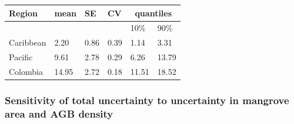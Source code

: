 \documentclass[review, authoryear]{elsarticle}   	%
\begin{document}
\begin{table}[htbp]
   \centering
   \begin{tabular}{p{3.0cm}p{2.0cm}p{2.0cm}p{2.0cm}p{2.0cm}p{2.0cm}} %
      \toprule
       Region & mean & SE & CV & \multicolumn{2}{c}{quantiles}\\
      \midrule
      &&&&10\%&90\%\\
      Caribbean&2.20&0.86&0.39&1.14&3.31\\
      Pacific&9.61&2.78&0.29&6.26&13.79\\
      Colombia&14.95&2.72&0.18&11.51&18.52\\
            \bottomrule
   \end{tabular}
   \label{tab:meansTotal}
\end{table}


\subsubsection{Sensitivity of total uncertainty to uncertainty in mangrove area and AGB density}

\end{document}
